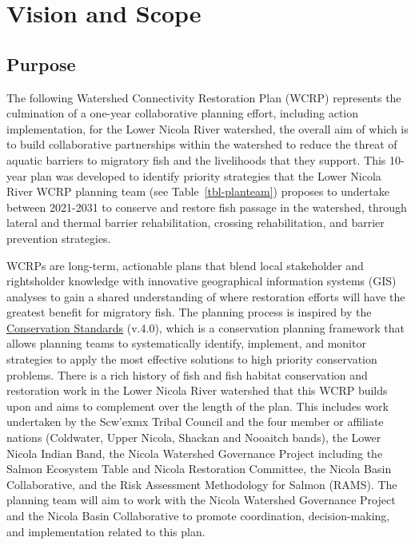 \documentclass[
  letterpaper,
  DIV=11,
  numbers=noendperiod]{scrreprt}
\begin{document}

\hypertarget{vision-and-scope}{%
\chapter{Vision and Scope}\label{vision-and-scope}}

\hypertarget{purpose-1}{%
\section*{Purpose}\label{purpose-1}}


The following Watershed Connectivity Restoration Plan (WCRP) represents
the culmination of a one-year collaborative planning effort, including
action implementation, for the Lower Nicola River watershed, the overall
aim of which is to build collaborative partnerships within the watershed
to reduce the threat of aquatic barriers to migratory fish and the
livelihoods that they support. This 10-year plan was developed to
identify priority strategies that the Lower Nicola River WCRP planning
team (see Table~\ref{tbl-planteam}) proposes to undertake between
2021-2031 to conserve and restore fish passage in the watershed, through
lateral and thermal barrier rehabilitation, crossing rehabilitation, and
barrier prevention strategies.

WCRPs are long-term, actionable plans that blend local stakeholder and
rightsholder knowledge with innovative geographical information systems
(GIS) analyses to gain a shared understanding of where restoration
efforts will have the greatest benefit for migratory fish. The planning
process is inspired by the
\href{https://conservationstandards.org/wp-content/uploads/sites/3/2023/09/CMP-Open-Standards-for-the-Practice-of-Conservation-v4.0-English.pdf}{Conservation
Standards} (v.4.0), which is a conservation planning framework that
allows planning teams to systematically identify, implement, and monitor
strategies to apply the most effective solutions to high priority
conservation problems. There is a rich history of fish and fish habitat
conservation and restoration work in the Lower Nicola River watershed
that this WCRP builds upon and aims to complement over the length of the
plan. This includes work undertaken by the Scw'exmx Tribal Council and
the four member or affiliate nations (Coldwater, Upper Nicola, Shackan
and Nooaitch bands), the Lower Nicola Indian Band, the Nicola Watershed
Governance Project including the Salmon Ecosystem Table and Nicola
Restoration Committee, the Nicola Basin Collaborative, and the Risk
Assessment Methodology for Salmon (RAMS). The planning team will aim to
work with the Nicola Watershed Governance Project and the Nicola Basin
Collaborative to promote coordination, decision-making, and
implementation related to this plan.
\end{document}
